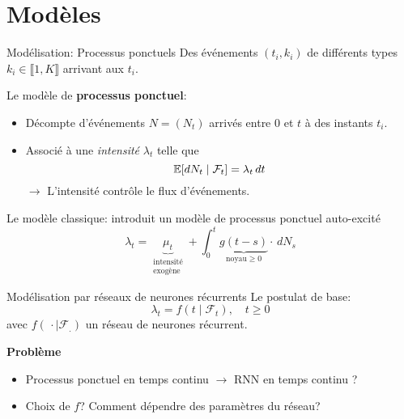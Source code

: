 \documentclass[../main.tex]{subfiles}
\begin{document}
\section{Modèles}

\begin{frame}{Modélisation: Processus ponctuels}
Des événements $(t_i, k_i)$ de différents types $k_i\in\llbracket 1, K\rrbracket$ arrivant  aux $t_i$.\pause

Le modèle de \textbf{processus ponctuel}:
\begin{itemize}
	\item[\textbullet] Décompte d'événements $N = (N_t)$ arrivés entre $0$ et $t$ à des instants $t_i$.
	\item[\textbullet] Associé à une \textit{intensité} $\lambda_t$ telle que
	\[
	\mathbb{E}[dN_t\mid \mathcal{F}_t] = \lambda_t\,dt
	\]\pause
	$\rightarrow$ L'intensité contrôle le flux d'événements.
\end{itemize}

\end{frame}

\begin{frame}{Le modèle classique: \parencite{hawkes1971}}
\citeauthor{hawkes1971} introduit un modèle de processus ponctuel auto-excité
\begin{equation}
	\lambda_t =
	\underbrace{\mu_t}_{\substack{\text{intensité}\\\text{exogène}}} + \int_0^t \underbrace{g(t-s)}_{\text{noyau}\geq 0}\cdot\, dN_s
\end{equation}
\end{frame}


\begin{frame}{Modélisation par réseaux de neurones récurrents}
Le postulat de base:
\begin{equation}
	\lambda_t = f(t\mid \mathcal{F}_t),\quad t \geq 0
\end{equation}
avec $f(\,\cdot \mid \mathcal{F_{.}})$ un réseau de neurones récurrent.\pause

\noindent\textbf{Problème} \begin{itemize}
\item Processus ponctuel en temps continu $\rightarrow$ RNN en temps continu ?
\item Choix de $f$? Comment dépendre des paramètres du réseau?
\end{itemize}

\end{frame}
\end{document}
